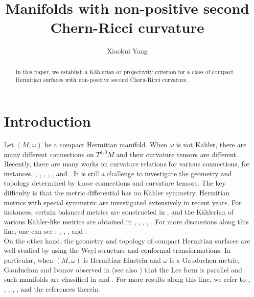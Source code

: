 \documentclass[12pt]{amsart}
\title{Manifolds with non-positive second Chern-Ricci curvature}
\author{Xiaokui Yang}
\theoremstyle{plain}
\theoremstyle{definition}
\renewcommand{\>}{\rightarrow}
\numberwithin{equation}{section} %
\begin{document}
	
	\begin{abstract} In this paper, we establish a K\"ahlerian or projectivity criterion for a class of compact Hermitian surfaces with non-positive second Chern-Ricci curvature.
	\end{abstract}
	
	
	\maketitle
	

	
		\section{Introduction} 
	
Let $(M,\omega)$ be a compact Hermitian manifold. When $\omega$ is not K\"ahler, there are many different connections on $T^{1,0}M$ and their curvature tensors are different. Recently, there are many works on curvature relations for various connections, for instances, \cite{Broder2023}, \cite{He2020}, \cite{LiuYang2012}, \cite{LiuYang2017}, \cite{Ni2023},  \cite{WangYang2019} and \cite{YangZheng2018}.
 It is still a challenge to investigate the geometry and topology determined by those connections and curvature tensors.  The key difficulty is that the metric differential has no K\"ahler symmetry. Hermitian metrics with special symmetric are investigated extensively in recent years.  For instances, certain balanced metrics are constructed  in  \cite{Fu2012a},  and the K\"ahlerian of various K\"ahler-like metrics are obtained in \cite{Angella2022}, \cite{Podesta2018}, \cite{Podesta2023}, \cite{Yau2023}, \cite{Zhao2023}. For more discussions  along this line,  one can see  \cite{Correa2023}, \cite{Fino2004}, \cite{Fu2010},  \cite{Fu2012}, \cite{Ivanov2013} and  \cite{Zheng2019}.\\ 
 
 On the other hand, the geometry and topology of compact Hermitian surfaces are well studied  by using the  Weyl structure and conformal transformations. In particular, when $(M,\omega)$ is Hermitian-Einstein and $\omega$ is a Gauduchon metric, Gauduchon and Ivanov observed in \cite{Gauduchon1997} (see also \cite{Tod1992}) that the Lee form is parallel and such manifolds are classified  in \cite{Gauduchon1995} and \cite{Gauduchon1997}. For more results along this line, we refer to
 \cite{Apostolov1996}, \cite{Apostolov}, \cite{Calderbank1999},  \cite{LeBrun1999}, \cite{LeBrun2012}, \cite{Pedersen1993} and the references therein.\\
 
\end{document}
